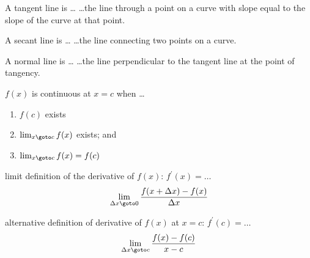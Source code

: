 \documentclass[avery5371,grid]{flashcards}
\begin{document}
\begin{flashcard}[Definition]{A tangent line is \ldots}
    \ldots the line through a point on a curve with slope equal
        to the slope of the curve at that point.
    \begin{tikzpicture}
    \end{tikzpicture}
\end{flashcard}

\begin{flashcard}[Definition]{A secant line is \ldots}
    \ldots the line connecting two points on a curve.
    \begin{tikzpicture}
    \end{tikzpicture}
\end{flashcard}

\begin{flashcard}[Definition]{A normal line is \ldots}
    \ldots the line perpendicular to the tangent line at the point of tangency.
    \begin{tikzpicture}
    \end{tikzpicture}
\end{flashcard}

\begin{flashcard}[Definition]{$f(x)$ is continuous at $x=c$ when \ldots}
    \begin{enumerate}
        \item $f(c)$ exists
        \item $\lim_{x\goto c} f(x)$ exists; and
        \item $\lim_{x\goto c} f(x) = f(c)$ 
    \end{enumerate}
\end{flashcard}

\begin{flashcard}[Definition]{limit definition of the derivative of $f(x)$: $f^{\prime}(x)=\ldots$}
    \begin{equation}
        \lim_{\Delta x\goto 0} \frac{f(x+\Delta x) - f(x)}{\Delta x}
    \end{equation}
\end{flashcard}

\begin{flashcard}[Definition]{alternative definition of derivative of $f(x)$ at $x=c$: $f^{\prime}(c)=\ldots$}
    \begin{equation}
        \lim_{\Delta x\goto c} \frac{f(x) - f(c)}{x-c}
    \end{equation}
\end{flashcard}
\end{document}
